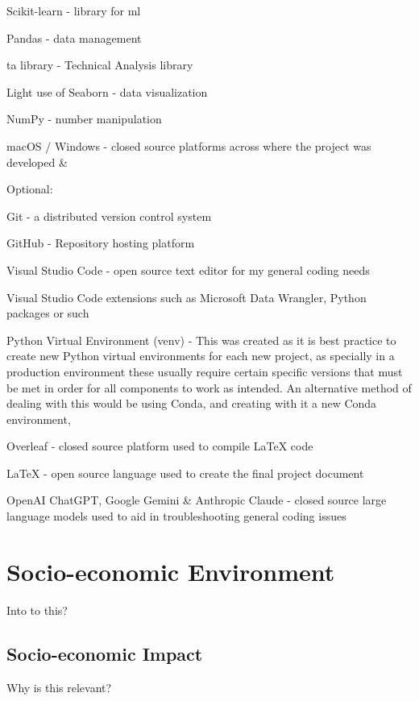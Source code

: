 \documentclass[12pt]{report} %
\begin{document}
Scikit-learn - library for ml \cite{scikit-learn}

Pandas - data management \cite{pandas}

ta library - Technical Analysis library\cite{ta-lib}

Light use of Seaborn - data visualization \cite{seaborn}

NumPy - number manipulation \cite{numpy}

macOS / Windows - closed source platforms across where the project was developed \cite{macos} \& \cite{windows}

Optional:

Git - a distributed version control system \cite{git}

GitHub - Repository hosting platform \cite{github}

Visual Studio Code - open source text editor for my general coding needs \cite{vscode}

Visual Studio Code extensions such as Microsoft Data Wrangler, Python packages or such

Python Virtual Environment (venv) - This was created as it is best practice to create new Python virtual environments for each new project, as specially in a production environment these usually require certain specific versions that must be met in order for all components to work as intended. An alternative method of dealing with this would be using Conda, and creating with it a new Conda environment, \cite{python_venv}

Overleaf - closed source platform used to compile LaTeX code \cite{overleaf}

LaTeX - open source language used to create the final project document \cite{latex}

OpenAI ChatGPT, Google Gemini \& Anthropic Claude - closed source large language models used to aid in troubleshooting general coding issues



\chapter{Socio-economic Environment}
Into to this?


\section{Socio-economic Impact}

Why is this relevant?
\end{document}

